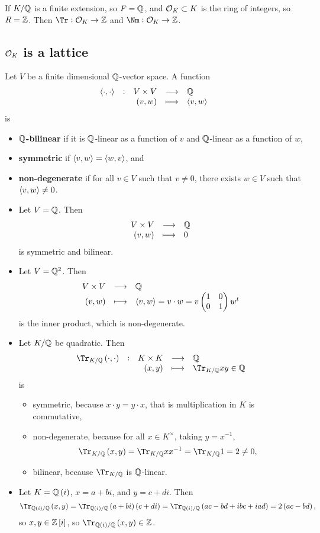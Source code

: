 \begin{corollary}
If $ K / \mathbb{Q} $ is a finite extension, so $ F = \mathbb{Q} $, and $ \mathcal{O}_K \subset K $ is the ring of integers, so $ R = \mathbb{Z} $. Then $ \Tr : \OOO_K \to \ZZ $ and $ \Nm : \OOO_K \to \ZZ $.
\end{corollary}

\subsection{\texorpdfstring{$ \mathcal{O}_K $}{OK} is a lattice}

\begin{definition}
Let $ V $ be a finite dimensional $ \mathbb{Q} $-vector space. A function
$$ \function[\abr{\cdot, \cdot}]{V \times V}{\QQ}{\br{v, w}}{\abr{v, w}} $$
is
\begin{itemize}
\item \textbf{$ \mathbb{Q} $-bilinear} if it is $ \mathbb{Q} $-linear as a function of $ v $ and $ \mathbb{Q} $-linear as a function of $ w $,
\item \textbf{symmetric} if $ \left\langle v, w \right\rangle = \left\langle w, v \right\rangle $, and
\item \textbf{non-degenerate} if for all $ v \in V $ such that $ v \ne 0 $, there exists $ w \in V $ such that $ \left\langle v, w \right\rangle \ne 0 $.
\end{itemize}
\end{definition}

\begin{example*}
\hfill
\begin{itemize}
\item Let $ V = \mathbb{Q} $. Then
$$ \function{V \times V}{\QQ}{\br{v, w}}{0} $$
is symmetric and bilinear.

\pagebreak

\item Let $ V = \mathbb{Q}^2 $. Then
$$ \function{V \times V}{\QQ}{\br{v, w}}{\abr{v, w} = v \cdot w = v\twobytwo{1}{0}{0}{1}w^t} $$
is the inner product, which is non-degenerate.
\item Let $ K / \mathbb{Q} $ be quadratic. Then
$$ \function[\Tr_{K / \QQ}\br{\cdot, \cdot}]{K \times K}{\QQ}{\br{x, y}}{\Tr_{K / \QQ} xy \in \QQ} $$
is
\begin{itemize}
\item symmetric, because $ x \cdot y = y \cdot x $, that is multiplication in $ K $ is commutative,
\item non-degenerate, because for all $ x \in K^\times $, taking $ y = x^{-1} $,
$$ \Tr_{K / \QQ}\br{x, y} = \Tr_{K / \QQ} xx^{-1} = \Tr_{K / \QQ} 1 = 2 \ne 0, $$
\item bilinear, because $ \Tr_{K / \QQ} $ is $ \mathbb{Q} $-linear.
\end{itemize}
\item Let $ K = \QQ\br{i} $, $ x = a + bi $, and $ y = c + di $. Then
$$ \Tr_{\QQ\br{i} / \QQ}\br{x, y} = \Tr_{\QQ\br{i} / \QQ} \br{a + bi}\br{c + di} = \Tr_{\QQ\br{i} / \QQ} \br{ac - bd + ibc + iad} = 2\br{ac - bd}, $$
so $ x, y \in \ZZ\sbr{i} $, so $ \Tr_{\QQ\br{i} / \QQ}\br{x, y} \in \ZZ $.
\end{itemize}
\end{example*}

